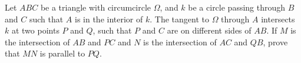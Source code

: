 Let $ABC$ be a triangle with circumcircle $\Omega$,
and $k$ be a circle passing through $B$ and $C$ such that $A$ is in the interior of $k$.
The tangent to $\Omega$ through $A$ intersects $k$ at two points $P$ and $Q$,
such that $P$ and $C$ are on different sides of $AB$.
If $M$ is the intersection of $AB$ and $PC$ and $N$ is the intersection of $AC$ and $QB$,
prove that $MN$ is parallel to $PQ$.
